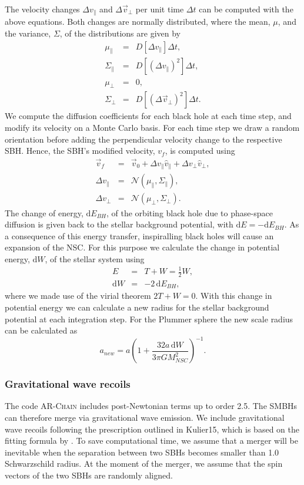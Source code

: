 \documentclass[english, apj]{emulateapj}
\begin{document}
The velocity changes $\Delta v_\parallel$ and $\Delta\vec{v}_\bot$ per unit time $\Delta t$ can be computed with the above equations. Both changes are normally distributed, where the mean, $\mu$, and the variance, $\Sigma$, of the distributions are given by
\begin{eqnarray}
\mu_\parallel &=& D[\Delta v_\parallel]\Delta t,\\
\Sigma_\parallel &=& D[(\Delta v_\parallel)^2]\Delta t,\\
\mu_\bot &=& 0,\\
\Sigma_\bot &=& D[(\Delta \vec{v}_\bot)^2]\Delta t.
\end{eqnarray}
We compute the diffusion coefficients for each black hole at each time step, and modify its velocity on a Monte Carlo basis. For each time step we draw a random orientation before adding the perpendicular velocity change to the respective SBH. Hence, the SBH's modified velocity, $v_f$, is computed using
\begin{eqnarray}
\vec{v}_f &=& \vec{v}_0 + \Delta v_\parallel \hat{v}_\parallel + \Delta v_\bot \hat{v}_\bot,\\
\Delta v_\parallel &=& \mathcal{N}(\mu_\parallel, \Sigma_\parallel),\\
\Delta v_\bot &=& \mathcal{N}(\mu_\bot, \Sigma_\bot).
\end{eqnarray}
The change of energy, $\mbox{d}E_{BH}$, of the orbiting black hole due to phase-space diffusion is given back to the stellar background potential, with $\mbox{d}E = -\mbox{d}E_{BH}$. As a consequence of this energy transfer, inspiralling black holes will cause an expansion of the NSC. For this purpose we calculate the change in potential energy, $\mbox{d}W$, of the stellar system using
\begin{eqnarray}
E &=& T + W = \frac{1}{2}W,\\
\mbox{d}W &=& -2\,\mbox{d}E_{BH},
\end{eqnarray}
where we made use of the virial theorem $2T+W =0$. With this change in potential energy we can calculate a new radius for the stellar background potential at each integration step. For the Plummer sphere the new scale radius can be calculated as
\begin{equation}
a_{new} = a\left(1+\frac{32a\,\mbox{d}W}{3\pi GM_{NSC}^2}\right)^{-1}.
\end{equation}

\subsubsection{Gravitational wave recoils}
The code \textsc{AR-Chain} includes post-Newtonian terms up to order 2.5. The SMBHs can therefore merge via gravitational wave emission. We include gravitational wave recoils following the prescription outlined in Kulier15, which is based on the fitting formula by \citet{2012PhRvD..85h4015L}. To save computational time, we assume that a merger will be inevitable when the separation between two SBHs becomes smaller than 1.0 Schwarzschild radius. At the moment of the merger, we assume that the spin vectors of the two SBHs are randomly aligned.
\end{document}
